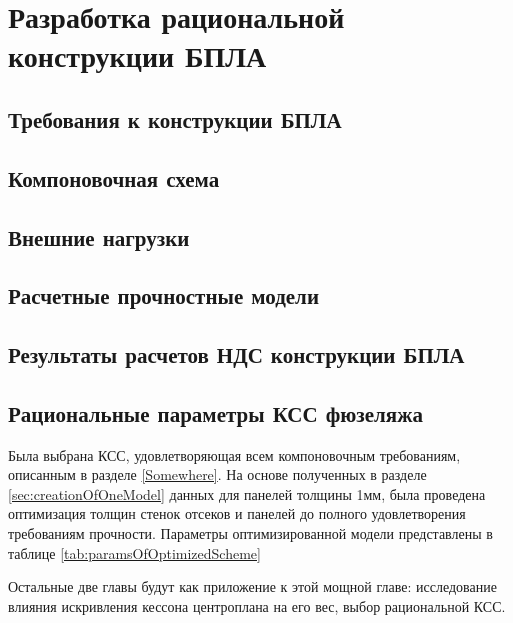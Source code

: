 \chapter{Разработка рациональной конструкции БПЛА}

\section{Требования к конструкции БПЛА}



\section{Компоновочная схема}
	

\section{Внешние нагрузки}



\section{Расчетные прочностные модели}




\section{Результаты расчетов НДС конструкции БПЛА}


\section{Рациональные параметры КСС фюзеляжа}
Была выбрана КСС, удовлетворяющая всем компоновочным требованиям, описанным в разделе \ref{Somewhere}. 
На основе полученных в разделе \ref{sec:creationOfOneModel} данных для панелей толщины 1мм, была проведена оптимизация толщин стенок отсеков и панелей до полного удовлетворения требованиям прочности. Параметры оптимизированной модели представлены в таблице \ref{tab:paramsOfOptimizedScheme}

Остальные две главы будут как приложение к этой мощной главе: исследование влияния искривления кессона центроплана на его вес, выбор рациональной КСС.